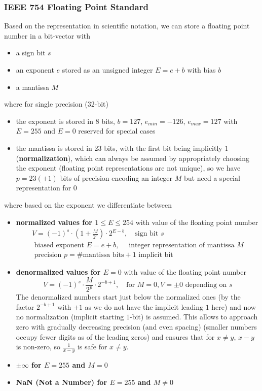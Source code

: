 \subsubsection{IEEE 754 Floating Point Standard}
Based on the representation in scientific notation, we can store a floating point number in a bit-vector with
\begin{itemize}
    \item a sign bit $s$
    \item an exponent $e$ stored as an unsigned integer $E = e + b$ with bias $b$
    \item a mantissa $M$
\end{itemize}
where for single precision (32-bit)
\begin{itemize}
    \item the exponent is stored in 8 bits, $b = 127$, $e_{min} = -126$, $e_{max} = 127$ with $E = 255$ and $E = 0$ reserved for special cases
    \item the mantissa is stored in 23 bits, with the first bit being implicitly $1$ (\textbf{normalization}), which can always be assumed by appropriately choosing the exponent (floating point representations are not unique), so we have $p = 23(+1)$ bits of precision encoding an integer $M$ but need a special representation for $0$
\end{itemize}
where based on the exponent we differentiate between
\begin{itemize}
    \item \textbf{normalized values for $1 \leq E \leq 254$}  with value of the floating point number
    \begin{equation}
        \begin{multlined}
            V = (-1)^s \cdot \left(1 + \frac{M}{2^p}\right) \cdot 2^{E-b}, \quad \text{sign bit } s\\
            \text{ biased exponent } E = e + b, \quad \text{ integer representation of mantissa } M \\
            \text{ precision } p = \#\text{mantissa bits} + 1 \text{ implicit bit}
        \end{multlined}
    \end{equation}
    \item \textbf{denormalized values for $E = 0$} with value of the floating point number
    \begin{equation}
        V = (-1)^s \cdot \frac{M}{2^p} \cdot 2^{-b + 1},  \quad \text{for } M = 0, V = \pm 0 \text{ depending on } s
    \end{equation}
    The denormalized numbers start just below the normalized ones (by the factor $2^{-b + 1}$ with $+1$ as we do not have the implicit leading $1$ here) and now no normalization (implicit starting $1$-bit) is assumed. This 
    allows to approach zero with gradually decreasing precision (and even spacing) (smaller numbers occupy fewer digits as of the leading zeros) and ensures that for $x\ne y$, $x-y$ is non-zero, so $\frac{1}{x-y}$ is safe for $x \ne y$.
    \item \textbf{$\pm \infty$ for $E = 255$ and $M = 0$}
    \item \textbf{NaN (Not a Number) for $E = 255$ and $M \ne 0$}
\end{itemize}

